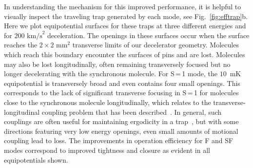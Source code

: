 \documentclass[%
 reprint,
 amsmath,amssymb,
 aps,
prl,
]{revtex4-1}
\begin{document}
In understanding the mechanism for this improved performance, it is helpful to visually inspect the traveling trap generated by each mode, see Fig.~\ref{fig:efftrap}b.
Here we plot equipotential surfaces for these traps at three different energies and for $200 \text{ km/s}^2$ deceleration.
The openings in these surfaces occur when the surface reaches the $2 \times 2\text{ mm}^2$ transverse limits of our decelerator geometry.
Molecules which reach this boundary encounter the surfaces of pins and are lost.
Molecules may also be lost longitudinally, often remaining transversely focused but no longer decelerating with the synchronous molecule.
For S\,=\,1 mode, the $10$~mK equipotential is transversely broad and even contains four small openings.
This corresponds to the lack of significant transverse focusing in S\,=\,1 for molecules close to the synchronous molecule longitudinally, which relates to the transverse-longitudinal coupling problem that has been described~\cite{VanDeMeerakker2006}.
In general, such couplings are often useful for maintaining ergodicity in a trap~\cite{Surkov1996}, but with some directions featuring very low energy openings, even small amounts of motional coupling lead to loss.
The improvements in operation efficiency for F and SF modes correspond to improved tightness and closure as evident in all equipotentials shown.
\end{document}
